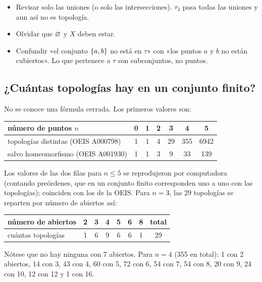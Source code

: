 \begin{ojo}
\begin{itemize}
\item Revisar solo las uniones (o solo las intersecciones). $\tau_3$ pasa todas las uniones y aun así no es topología.
\item Olvidar que $\varnothing$ y $X$ deben estar.
\item Confundir «el conjunto $\{a,b\}$ no está en $\tau$» con «los puntos $a$ y $b$ no están cubiertos». Lo que
pertenece a $\tau$ son subconjuntos, no puntos.
\end{itemize}
\end{ojo}

\subsection{¿Cuántas topologías hay en un conjunto finito?}\label{sec:cuantas}
No se conoce una fórmula cerrada. Los primeros valores son:
\begin{center}\small\renewcommand{\arraystretch}{1.2}
\begin{tabular}{@{}lcccccc@{}}\toprule
número de puntos $n$ & 0 & 1 & 2 & 3 & 4 & 5\\ \midrule
topologías distintas (OEIS A000798) & 1 & 1 & 4 & 29 & 355 & 6942\\
salvo homeomorfismo (OEIS A001930) & 1 & 1 & 3 & 9 & 33 & 139\\ \bottomrule
\end{tabular}\end{center}
Los valores de las dos filas para $n\le5$ se reprodujeron por computadora (contando preórdenes, que en un conjunto
finito corresponden uno a uno con las topologías); coinciden con los de la OEIS. Para $n=3$, las 29 topologías se reparten por número de abiertos así:
\begin{center}\small\renewcommand{\arraystretch}{1.2}
\begin{tabular}{@{}lcccccc|c@{}}\toprule
número de abiertos & 2 & 3 & 4 & 5 & 6 & 8 & total\\ \midrule
cuántas topologías & 1 & 6 & 9 & 6 & 6 & 1 & 29\\ \bottomrule
\end{tabular}\end{center}
Nótese que no hay ninguna con 7 abiertos. Para $n=4$ (355 en total): 1 con 2 abiertos, 14 con 3, 43 con 4, 60 con 5,
72 con 6, 54 con 7, 54 con 8, 20 con 9, 24 con 10, 12 con 12 y 1 con 16.

